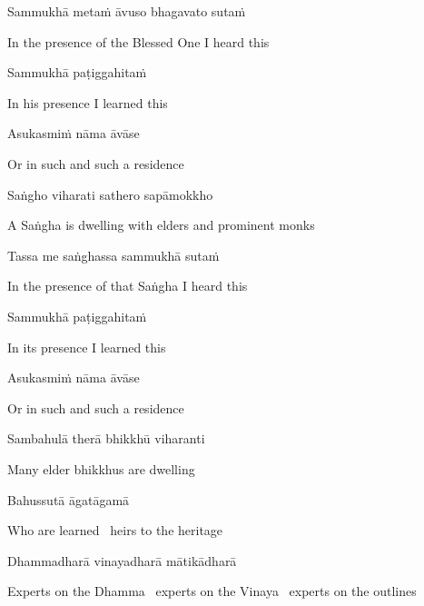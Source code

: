 Sammukhā metaṁ āvuso bhagavato sutaṁ

\begin{cprenglish}
  In the presence of the Blessed One I heard this
\end{cprenglish}

Sammukhā paṭiggahitaṁ

\begin{cprenglish}
  In his presence I learned this
\end{cprenglish}

Asukasmiṁ nāma āvāse

\begin{cprenglish}
  Or in such and such a residence
\end{cprenglish}

Saṅgho viharati sathero sapāmokkho

\begin{cprenglish}
  A Saṅgha is dwelling with elders and prominent monks
\end{cprenglish}

Tassa me saṅghassa sammukhā sutaṁ

\begin{cprenglish}
  In the presence of that Saṅgha I heard this
\end{cprenglish}

Sammukhā paṭiggahitaṁ

\begin{cprenglish}
  In its presence I learned this
\end{cprenglish}

Asukasmiṁ nāma āvāse

\begin{cprenglish}
  Or in such and such a residence
\end{cprenglish}

Sambahulā therā bhikkhū viharanti

\begin{cprenglish}
  Many elder bhikkhus are dwelling
\end{cprenglish}

Bahussutā āgatāgamā

\begin{cprenglish}
  Who are learned \breathmark\ heirs to the heritage
\end{cprenglish}

Dhammadharā vinayadharā mātikādharā

\begin{cprenglish}
  Experts on the Dhamma \breathmark\ experts on the Vinaya \breathmark\ experts on the outlines
\end{cprenglish}

